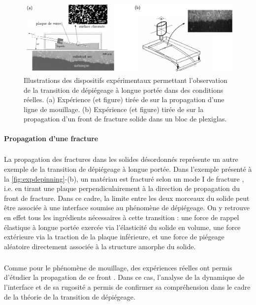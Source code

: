\begin{figure}[h]
	\centering
	\includegraphics[width=\textwidth]{Chapitre1/Figures/Depinning/expdepinning.pdf}
	\caption{Illustrations des dispositifs expérimentaux permettant l'observation de la transition de dépiégeage à longue portée dans des conditions réelles. (a) Expérience (et figure) tirée de \cite{moulinet_roughness_2002} sur la propagation d'une ligne de mouillage. (b) Expérience (et figure) tirée de \cite{schmittbuhl_direct_1997} sur la propagation d'un front de fracture solide dans un bloc de plexiglas.}
	\label{fig:expdepinning}
\end{figure}

\paragraph{Propagation d'une fracture}

\subparagraph{}La propagation des fractures dans les solides désordonnés représente un autre exemple de la transition de dépiégeage à longue portée. Dans l'exemple présenté à la \autoref{fig:expdepinning}-(b), un matériau est fracturé selon un mode I de fracture \cite{le_priol_long_range_2020}, i.e. en tirant une plaque perpendiculairement à la direction de propagation du front de fracture. Dans ce cadre, la limite entre les deux morceaux du solide peut être associée à une interface soumise au phénomène de dépiégeage. On y retrouve en effet tous les ingrédients nécessaires à cette transition : une force de rappel élastique à longue portée exercée via l'élasticité du solide en volume, une force extérieure via la traction de la plaque inférieure, et une force de piégeage aléatoire directement associée à la structure amorphe du solide.

\subparagraph{}Comme pour le phénomène de mouillage, des expériences réelles ont permis d'étudier la propagation de ce front \cite{schmittbuhl_direct_1997, delaplace_high_1999, santucci_fracture_2010, le_priol_universal_2020}. Dans ce cas, l'analyse de la dynamique de l'interface et de sa rugosité a permis de confirmer sa compréhension dans le cadre de la théorie de la transition de dépiégeage.

